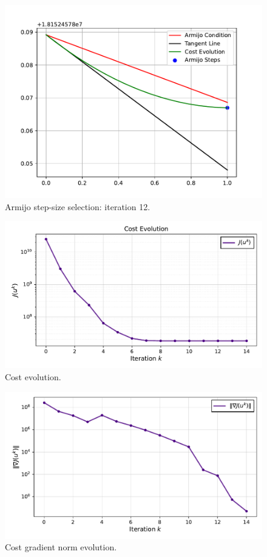 \begin{figure}[htb]
    \centering
    \includegraphics[width=1\linewidth]{img/1-Task1/Armijo_iter_12.pdf}
    \caption{Armijo step-size selection: iteration 12.}
    \label{fig:armijo12}
\end{figure}

\begin{figure}[htb]
    \centering
    \includegraphics[width=1\linewidth]{img/1-Task1/cost_evolution.pdf}
    \caption{Cost evolution.}
    \label{fig:t1_costevo}
\end{figure}

\begin{figure}[htb]
    \centering
    \includegraphics[width=1\linewidth]{img/1-Task1/grad_j_norm.pdf}
    \caption{Cost gradient norm evolution.}
    \label{fig:t1_gradj}
\end{figure}

